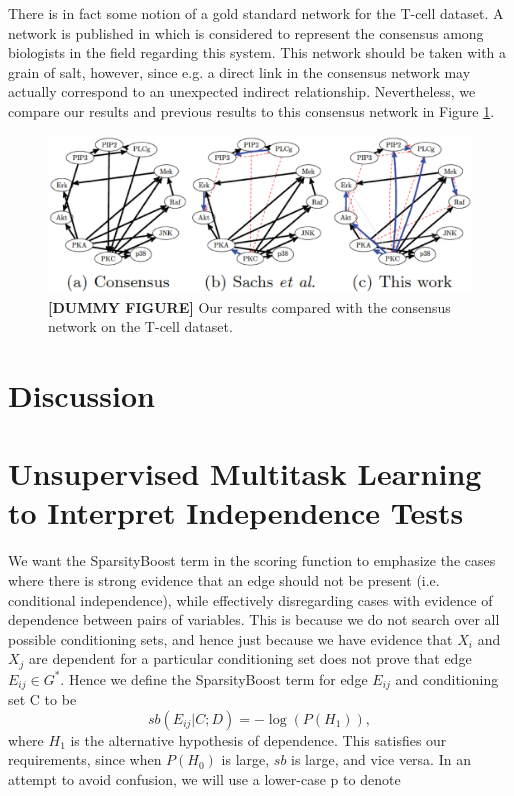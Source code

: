 \documentclass{article} %
\begin{document}
There is in fact some notion of a gold standard network for the T-cell dataset.  A network is published in \cite{sachs2005causal} which is considered to represent the consensus among biologists in the field regarding this system.  This network should be taken with a grain of salt, however, since e.g. a direct link in the consensus network may actually correspond to an unexpected  indirect relationship.  Nevertheless, we compare our results and previous results to this consensus network in Figure \ref{fig:sachs}.

\begin{figure}[h]
\centering
\includegraphics[width=1.1\linewidth]{img/dummy_sachs.eps} 
\caption{{\bf[DUMMY FIGURE]} Our results compared with the consensus network on the T-cell dataset.}
\label{fig:sachs}
\end{figure}


\section{Discussion}

\appendix
\section{Unsupervised Multitask Learning to Interpret Independence Tests}
We want the SparsityBoost term in the scoring function to emphasize the cases where there is strong evidence that an edge should not be present (i.e. conditional independence), while effectively disregarding cases with evidence of dependence between pairs of variables.  This is because we do not search over all possible conditioning sets, and hence just because we have evidence that $X_i$ and $X_j$ are dependent for a particular conditioning set does not prove that edge $E_{ij} \in G^*$.  Hence we define the SparsityBoost term for edge $E_{ij}$ and conditioning set C to be $$sb(E_{ij} | C; D) = -\log(P(H_1)),$$ where $H_1$ is the alternative hypothesis of dependence.  This satisfies our requirements, since when $P(H_0)$ is large, $sb$ is large, and vice versa.  In an attempt to avoid confusion, we will use a lower-case p to denote 
\end{document}
